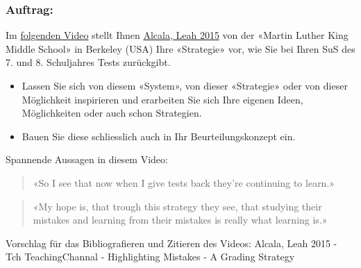 \documentclass[
  10pt,
  a4paper,
  DIV=11]{scrartcl}
\providecommand{\tightlist}{%
  \setlength{\itemsep}{0pt}\setlength{\parskip}{0pt}}\usepackage{longtable,booktabs,array}
\begin{document}
\begin{tcolorbox}[enhanced jigsaw, colframe=quarto-callout-caution-color-frame, toptitle=1mm, title=\textcolor{quarto-callout-caution-color}{\faFire}\hspace{0.5em}{Auftrag auf LearningView}, left=2mm, breakable, opacitybacktitle=0.6, leftrule=.75mm, colbacktitle=quarto-callout-caution-color!10!white, colback=white, coltitle=black, toprule=.15mm, arc=.35mm, bottomtitle=1mm, bottomrule=.15mm, titlerule=0mm, rightrule=.15mm, opacityback=0]

\subsubsection{Auftrag:}\label{auftrag}

Im
\href{https://phbern365.sharepoint.com/:v:/r/sites/IS1.Z.Studienplanentwicklung2022/Freigegebene\%20Dokumente/General/BA\%20-\%20Beurteilung\%20(formativ\%20und\%20summativ)/Lerngelegenheiten/Grundlagen\%20der\%20Beurteilung\%20SOL\%20-\%20Conrardy/Alcala,\%20Leah\%202015\%20-\%20Tch\%20TeachingChannal\%20-\%20Highlighting\%20Mistakes\%20-\%20A\%20Grading\%20Strategy.mp4?csf=1&web=1&e=opTUxg}{folgenden
Video} stellt Ihnen
\href{https://learn.teachingchannel.com/video/math-test-grading-tips}{Alcala,
Leah 2015} von der «Martin Luther King Middle School» in Berkeley (USA)
Ihre «Strategie» vor, wie Sie bei Ihren SuS des 7. und 8. Schuljahres
Tests zurückgibt.

\begin{itemize}
\tightlist
\item
  Lassen Sie sich von diesem «System», von dieser «Strategie» oder von
  dieser Möglichkeit inspirieren und erarbeiten Sie sich Ihre eigenen
  Ideen, Möglichkeiten oder auch schon Strategien.
\item
  Bauen Sie diese schliesslich auch in Ihr Beurteilungskonzept ein.
\end{itemize}

Spannende Aussagen in diesem Video:

\begin{quote}
«So I see that now when I give tests back they're continuing to learn.»
\end{quote}

\begin{quote}
«My hope is, that trough this strategy they see, that studying their
mistakes and learning from their mistakes is really what learning is.»
\end{quote}

Vorschlag für das Bibliografieren und Zitieren des Videos: Alcala, Leah
2015 - Tch TeachingChannal - Highlighting Mistakes - A Grading Strategy

\end{tcolorbox}
\end{document}
